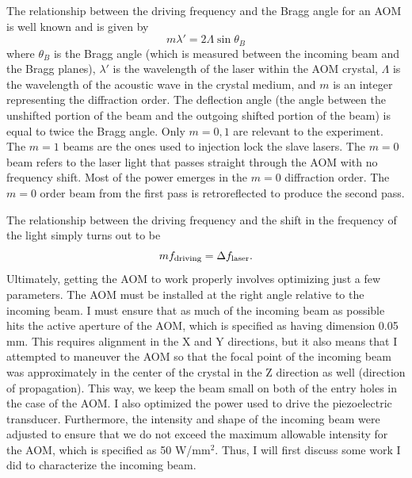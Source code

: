 The relationship between the driving frequency and the Bragg angle for an AOM is well known and is given by 
\begin{equation}
m\lambda' = 2 \Lambda \sin \theta_B
\end{equation}
where $\theta_B$ is the Bragg angle (which is measured between the incoming beam and the Bragg planes), $\lambda'$ is the wavelength of the laser within the AOM crystal, $\Lambda$ is the wavelength of the acoustic wave in the crystal medium, and $m$ is an integer representing the diffraction order. The deflection angle (the angle between the unshifted portion of the beam and the outgoing shifted portion of the beam) is equal to twice the Bragg angle. Only $m=0,1$ are relevant to the experiment. The $m=1$ beams are the ones used to injection lock the slave lasers. The $m=0$ beam refers to the laser light that passes straight through the AOM with no frequency shift. Most of the power emerges in the $m=0$ diffraction order. The $m=0$ order beam from the first pass is retroreflected to produce the second pass.

The relationship between the driving frequency and the shift in the frequency of the light simply turns out to be 
\begin{equation}
    mf_{\textnormal{driving}}=\Delta f_{\textnormal{laser}}.
\end{equation}
Ultimately, getting the AOM to work properly involves optimizing just a few parameters. The AOM must be installed at the right angle relative to the incoming beam. I must ensure that as much of the incoming beam as possible hits the active aperture of the AOM, which is specified as having dimension 0.05 mm. This requires alignment in the X and Y directions, but it also means that I attempted to maneuver the AOM so that the focal point of the incoming beam was approximately in the center of the crystal in the Z direction as well (direction of propagation). This way, we keep the beam small on both of the entry holes in the case of the AOM. I also optimized the power used to drive the piezoelectric transducer. Furthermore, the intensity and shape of the incoming beam were adjusted to ensure that we do not exceed the maximum allowable intensity for the AOM, which is specified as 50 W/mm$^2$.
Thus, I will first discuss some work I did to characterize the incoming beam.


